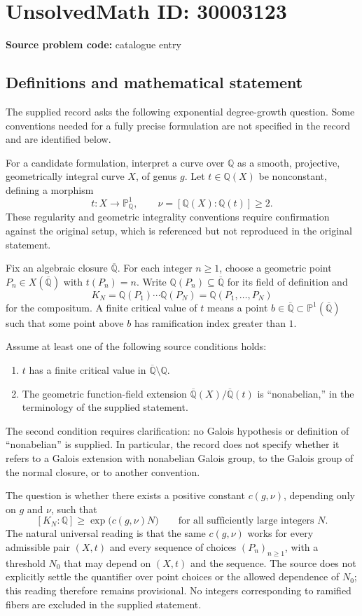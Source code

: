 \documentclass[11pt]{article}
\newcommand{\Q}{\mathbb{Q}}
\newcommand{\PP}{\mathbb{P}}
\begin{document}
\section*{UnsolvedMath ID: 30003123}
\textbf{Source problem code:} catalogue entry
\subsection{Definitions and mathematical statement}
The supplied record asks the following exponential degree-growth question. Some conventions needed for a fully precise formulation are not specified in the record and are identified below.

For a candidate formulation, interpret a curve over \(\Q\) as a smooth, projective, geometrically integral curve \(X\), of genus \(g\). Let \(t\in\Q(X)\) be nonconstant, defining a morphism
\[
 t:X\longrightarrow\PP^1_{\Q},\qquad
 \nu=[\Q(X):\Q(t)]\geq2.
\]
These regularity and geometric integrality conventions require confirmation against the original setup, which is referenced but not reproduced in the original statement.

Fix an algebraic closure \(\overline{\Q}\). For each integer \(n\geq1\), choose a geometric point \(P_n\in X(\overline{\Q})\) with \(t(P_n)=n\). Write \(\Q(P_n)\subseteq\overline{\Q}\) for its field of definition and
\[
 K_N=\Q(P_1)\cdots\Q(P_N)
     =\Q(P_1,\ldots,P_N)
\]
for the compositum. A finite critical value of \(t\) means a point \(b\in\overline{\Q}\subset\PP^1(\overline{\Q})\) such that some point above \(b\) has ramification index greater than \(1\).

Assume at least one of the following source conditions holds:
\begin{enumerate}
\item \(t\) has a finite critical value in \(\overline{\Q}\setminus\Q\).
\item The geometric function-field extension \(\overline{\Q}(X)/\overline{\Q}(t)\) is ``nonabelian,'' in the terminology of the supplied statement.
\end{enumerate}
The second condition requires clarification: no Galois hypothesis or definition of ``nonabelian'' is supplied. In particular, the record does not specify whether it refers to a Galois extension with nonabelian Galois group, to the Galois group of the normal closure, or to another convention.

The question is whether there exists a positive constant \(c(g,\nu)\), depending only on \(g\) and \(\nu\), such that
\[
 [K_N:\Q]\geq\exp\!\bigl(c(g,\nu)N\bigr)
 \qquad\text{for all sufficiently large integers }N.
\]
The natural universal reading is that the same \(c(g,\nu)\) works for every admissible pair \((X,t)\) and every sequence of choices \((P_n)_{n\geq1}\), with a threshold \(N_0\) that may depend on \((X,t)\) and the sequence. The source does not explicitly settle the quantifier over point choices or the allowed dependence of \(N_0\); this reading therefore remains provisional. No integers corresponding to ramified fibers are excluded in the supplied statement.
\end{document}

